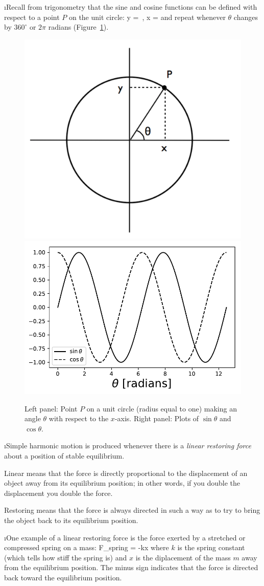 \i Recall from trigonometry that the sine and cosine functions 
can be defined with respect to a point $P$ on the unit circle:
%
\be
y = \sin\theta\,,\qquad
x = \cos\theta
\ee
%
and repeat whenever $\theta$ changes by $360^\circ$ or 
$2\pi$ radians (Figure~\ref{f:sine-cosine}).
%
\begin{figure}[htbp]
\begin{center}
\includegraphics[width=.40\textwidth]{circle-theta}
\includegraphics[width=.45\textwidth]{sine-cosine}
\caption{Left panel:
Point $P$ on a unit circle (radius equal to one)
making an angle $\theta$ with respect
to the $x$-axis.
Right panel: Plots of $\sin\theta$ and $\cos\theta$.}
\label{f:sine-cosine}
\end{center}
\end{figure}
%

\i Simple harmonic motion is produced whenever there is a
{\em linear restoring force} about a position of stable equilibrium.

Linear means that the force is directly proportional to the
displacement of an object away from its equilibrium position;
in other words, if you double the displacement you double the
force.

Restoring means that the force is always directed in such a 
way as to try to bring the object back to its equilibrium 
position.

\i One example of a linear restoring force is the force exerted 
by a stretched or compressed spring on a mass:
%
\be
F_{\rm spring} = -kx
\ee
%
where $k$ is the spring constant (which tells how stiff
the spring is) and $x$ is the diplacement of the mass $m$
away from the equilibrium position.
The minus sign indicates that the force is directed back toward
the equilibrium position.

